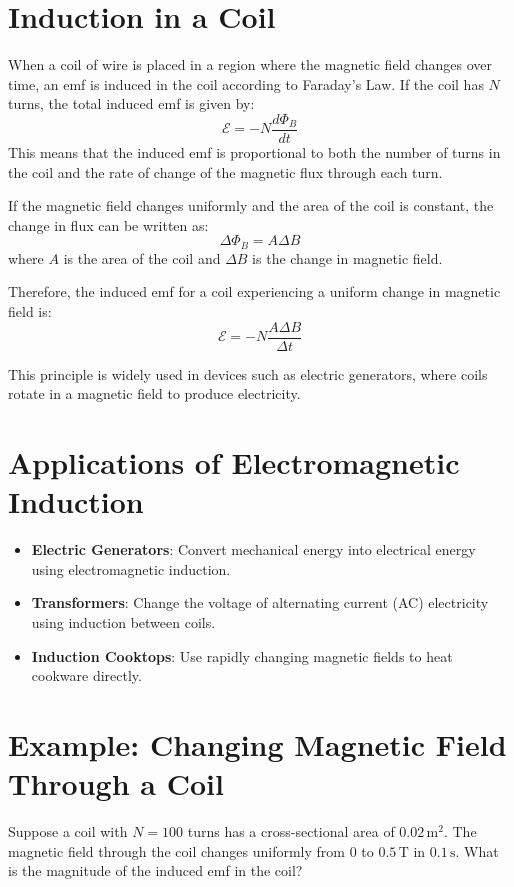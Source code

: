 \section{Induction in a Coil}
When a coil of wire is placed in a region where the magnetic field changes over time, an emf is induced in the coil according to Faraday's Law. If the coil has $N$ turns, the total induced emf is given by:
\[
\mathcal{E} = -N \frac{d\Phi_B}{dt}
\]  
This means that the induced emf is proportional to both the number of turns in the coil and the rate of change of the magnetic flux through each turn.

If the magnetic field changes uniformly and the area of the coil is constant, the change in flux can be written as:
\[
\Delta \Phi_B = A \Delta B
\]
where $A$ is the area of the coil and $\Delta B$ is the change in magnetic field.

Therefore, the induced emf for a coil experiencing a uniform change in magnetic field is:
\[  
\mathcal{E} = -N \frac{A \Delta B}{\Delta t}
\]

This principle is widely used in devices such as electric generators, where coils rotate in a magnetic field to produce electricity.

\section{Applications of Electromagnetic Induction}
\begin{itemize}
    \item \textbf{Electric Generators}: Convert mechanical energy into electrical energy using electromagnetic induction.
    \item \textbf{Transformers}: Change the voltage of alternating current (AC) electricity using induction between coils.
    \item \textbf{Induction Cooktops}: Use rapidly changing magnetic fields to heat cookware directly.
\end{itemize}

\section{Example: Changing Magnetic Field Through a Coil}
Suppose a coil with $N = 100$ turns has a cross-sectional area of $0.02\,\mathrm{m}^2$. The magnetic field through the coil changes uniformly from $0$ to $0.5\,\mathrm{T}$ in $0.1\,\mathrm{s}$. What is the magnitude of the induced emf in the coil?


